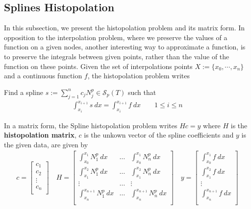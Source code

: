 \subsection{Splines Histopolation}
In this subsection, we present the histopolation problem and its matrix form.
In opposition to the interpolation problem, where we preserve the values of a function on a given nodes, another interesting way to approximate a function,  is to preserve the integrals between given points, rather than the value of the function on these points. Given the set of interpolations points $X:=\{ x_0, \cdots,x_{n} \}$ and a continuous function $f$, the histopolation problem writes 
\begin{definition}
  Find a spline $s := \sum\limits_{j=1}^{n} c_j N_j^p \in \mathcal{S}_p(T)$ such that
  \begin{align}
    \int_{x_i}^{x_{i+1}} s ~dx = \int_{x_i}^{x_{i+1}} f ~dx \quad \quad 1 \leq i \leq n
  \end{align}
\end{definition}
\noindent
In a matrix form, the Spline histopolation problem writes $ H c = y $ where $H$ is the \textbf{histopolation matrix}, $c$ is the unkown vector of the spline coefficients and $y$ is the given data, are given by
\begin{align*}
  c =  
  \begin{bmatrix}
    c_1\\
    c_2\\
    \vdots    \\ 
    c_n\\
  \end{bmatrix}
  \quad
  H = 
  \begin{bmatrix}
    \int_{x_0}^{x_{1}}N_1^p ~dx   & \ldots & \int_{x_0}^{x_{1}}N_n^p ~dx   \\
    \int_{x_1}^{x_{2}}N_1^p ~dx   & \ldots & \int_{x_1}^{x_{2}}N_n^p ~dx   \\
    \vdots                        & \ldots &                        \vdots \\
    \int_{x_n}^{x_{n+1}}N_1^p ~dx & \ldots & \int_{x_n}^{x_{n+1}}N_n^p ~dx \\
  \end{bmatrix}
  \quad
  y =  
  \begin{bmatrix}
    \int_{x_0}^{x_{1}}f ~dx\\
    \int_{x_1}^{x_{2}}f ~dx\\
    \vdots    \\ 
    \int_{x_n}^{x_{n+1}}f ~dx\\
  \end{bmatrix}
\end{align*}
